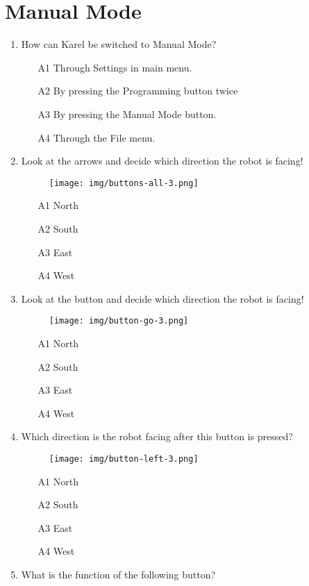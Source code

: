 \section{Manual Mode}

\begin{enumerate}
\item How can Karel be switched to Manual Mode?
\begin{enumerate}
\item[A1] Through Settings in main menu.
\item[A2] By pressing the Programming button twice
\item[A3] By pressing the Manual Mode button.
\item[A4] Through the File menu.
\end{enumerate}
\item Look at the arrows and decide which direction the robot is facing!
\newpage
\begin{figure}[!ht]
\begin{center}
\texttt{[image: img/buttons-all-3.png]}
\vspace{-6mm}
\end{center}
\end{figure}
\begin{enumerate}
\item[A1] North
\item[A2] South
\item[A3] East
\item[A4] West
\end{enumerate}  
\item Look at the button and decide which direction the robot is facing!
\begin{figure}[!ht]
\begin{center}
\texttt{[image: img/button-go-3.png]}
\end{center}
\end{figure}
\begin{enumerate}
\item[A1] North
\item[A2] South
\item[A3] East
\item[A4] West
\end{enumerate}
\item Which direction is the robot facing after 
this button is pressed?
\begin{figure}[!ht]
\begin{center}
\texttt{[image: img/button-left-3.png]}
\end{center}
\end{figure}
\begin{enumerate}
\item[A1] North
\item[A2] South
\item[A3] East
\item[A4] West
\end{enumerate}
\item What is the function of the following button?
\newpage


\end{enumerate}
